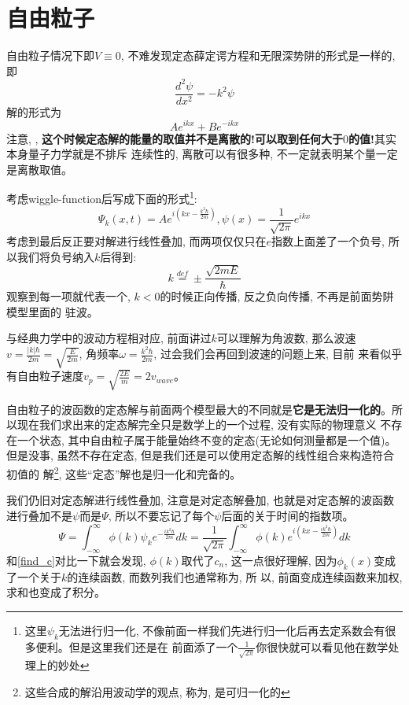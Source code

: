 \documentclass[a4paper,zihao=-4,linespread=1]{ctexrep}
\newenvironment{lequation}{\large\begin{equation}}{\end{equation}}
\begin{document}
    \section{自由粒子}
    自由粒子情况下即$V \equiv 0$, 不难发现定态薛定谔方程和无限深势阱的形式是一样的, 即$$\frac{d^2\psi}{dx^2}=-k^2\psi$$解的形式为$$Ae^{ikx}+Be^{-ikx}$$
    注意, , \textbf{这个时候定态解的能量的取值并不是离散的!可以取到任何大于$0$的值!}其实本身量子力学就是不排斥
    连续性的, 离散可以有很多种, 不一定就表明某个量一定是离散取值。

    考虑wiggle-function后写成下面的形式\footnote[1]{这里$\psi_k$无法进行归一化, 不像前面一样我们先进行归一化后再去定系数会有很多便利。但是这里我们还是在
    前面添了一个$\frac{1}{\sqrt{2\pi}}$你很快就可以看见他在数学处理上的妙处}:
    \begin{lequation}
        \boxed{
            \Psi_k(x,t)=Ae^{i\left(kx-\frac{k^2\hbar}{2m}\right)}, \psi(x)=\frac{1}{\sqrt{2\pi}}e^{ikx}
        }
    \end{lequation}
    考虑到最后反正要对解进行线性叠加, 而两项仅仅只在$e$指数上面差了一个负号, 所以我们将负号纳入$k$后得到:
    $$k\overset{def}{=}\pm\frac{\sqrt{2mE}}{\hbar}$$观察到每一项就代表一个, $k<0$的时候正向传播, 反之负向传播, 不再是前面势阱模型里面的
    驻波。
    
    与经典力学中的波动方程相对应, 前面讲过$k$可以理解为角波数, 那么波速$v=\frac{|k|\hbar}{2m}=\sqrt{\frac{E}{2m}}$, 角频率$\omega=\frac{k^2\hbar}{2m}$, 过会我们会再回到波速的问题上来, 目前
    来看似乎有自由粒子速度$v_p=\sqrt{\frac{2E}{m}}=2v_{wave}$。

    自由粒子的波函数的定态解与前面两个模型最大的不同就是\textbf{它是无法归一化的}。所以现在我们求出来的定态解完全只是数学上的一个过程, 没有实际的物理意义
    不存在一个状态, 其中自由粒子属于能量始终不变的定态(无论如何测量都是一个值)。但是没事, 虽然不存在定态, 但是我们还是可以使用定态解的线性组合来构造符合初值的
    解\footnote[2]{这些合成的解沿用波动学的观点, 称为, 是可归一化的}, 这些“定态”解也是归一化和完备的。

    我们仍旧对定态解进行线性叠加, 注意是对定态解叠加, 也就是对定态解的波函数进行叠加不是$\psi$而是$\Psi$, 所以不要忘记了每个$\psi$后面的关于时间的指数项。
    \begin{lequation}
        \boxed{
            \Psi=\int_{-\infty}^{\infty}\phi(k)\psi_ke^{-\frac{ik^2\hbar}{2m}}dk=\frac{1}{\sqrt{2\pi}}\int_{-\infty}^{\infty}\phi(k)e^{i\left(kx-\frac{ik^2\hbar}{2m}\right)}dk  
        }
    \end{lequation}
    和\ref{find_c}对比一下就会发现, $\phi(k)$取代了$c_n$, 这一点很好理解, 因为$\phi_k(x)$变成了一个关于$k$的连续函数, 而数列我们也通常称为, 所
    以, 前面变成连续函数来加权, 求和也变成了积分。
\end{document}
